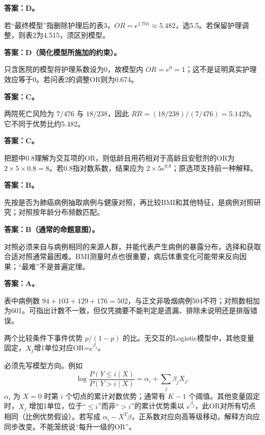 
\textbf{答案：D。}

若``最终模型''指删除护理后的表3，\(OR=e^{1.701}\approx5.482\)，选5.5。若保留护理调整，则表2为4.515，须区别模型。



\textbf{答案：D（简化模型所施加的约束）。}

只含医院的模型将护理系数设为0，故模型内 \(OR=e^0=1\)；这不是证明真实护理效应等于0。若问表2的调整OR则为0.674。



\textbf{答案：C。}

两院死亡风险为 \(7/476\) 与 \(18/238\)，因此 \(RR=(18/238)/(7/476)=5.1429\)。它不同于优势比约5.482。



\textbf{答案：C。}

把题中0.8理解为交互项的OR，则低龄且用药相对于高龄且安慰剂的OR为 \(2\times5\times0.8=8\)。若0.8指对数系数，结果应为 \(2\times5e^{0.8}\)；原选项支持前一种解释。



\textbf{答案：B。}

先按是否为肺癌病例抽取病例与健康对照，再比较BMI和其他特征，是病例对照研究；对照按年龄分布频数匹配。



\textbf{答案：B（通常的命题意图）。}

对照必须来自与病例相同的来源人群，并能代表产生病例的暴露分布，选择和获取合适对照通常最困难。BMI测量时点也很重要，病后体重变化可能带来反向因果；``最难''不是普遍定理。



\textbf{答案：A。}

表中病例数 \(94+103+129+176=502\)，与正文非吸烟病例504不符；对照数相加为601。可指出计数不一致，但仅凭摘要不能判定是遗漏、排除未说明还是排版错误。



两个比较条件下事件优势 \(p/(1-p)\) 的比。无交互的Logistic模型中，其他变量固定，\(X_j\)增1单位对应OR=\(e^{\beta_j}\)。



必须先写模型方向。例如 \[\log\frac{P(Y\le i\mid X)}{P(Y>i\mid X)}=\alpha_i+\sum_j\beta_jX_j.\] \(\alpha_i\) 为 \(X=0\) 时第 \(i\) 个切点的累计对数优势；通常有 \(K-1\) 个阈值。其他变量固定时，\(X_j\) 增加1单位，位于``\(\le i\)''而非``\(>i\)''的累计优势乘以 \(e^{\beta_j}\)，此OR对所有切点相同（比例优势假设）。若写成 \(\alpha_i-X^T\beta\)，正系数对应向高等级移动，解释方向应同步改变。不能笼统说``每升一级的OR''。


